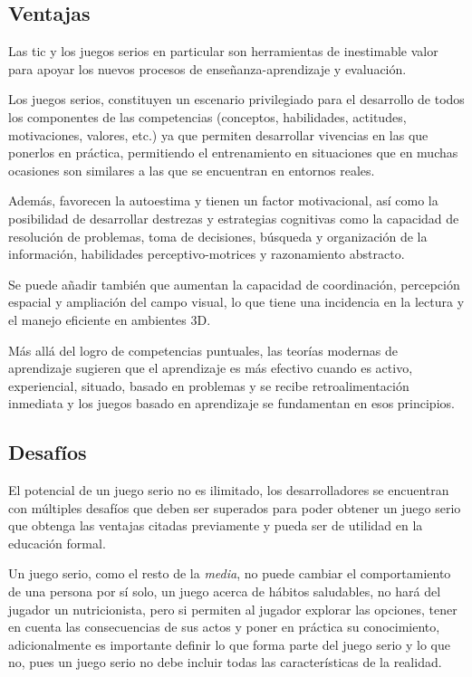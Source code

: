 \subsection{Ventajas}


Las \Gls{tic} y los juegos serios en particular son herramientas de inestimable
valor para apoyar los nuevos procesos de enseñanza-aprendizaje y
evaluación\cite{guenaga2013serious}.

Los juegos serios, constituyen un escenario privilegiado para el desarrollo de
todos los componentes de las competencias (conceptos, habilidades, actitudes,
motivaciones, valores, etc.) ya que permiten desarrollar vivencias en las que
ponerlos en práctica, permitiendo el entrenamiento en situaciones que en muchas
ocasiones son similares a las que se encuentran en entornos
reales\cite{guenaga2013serious}.

Además, favorecen la autoestima y tienen un factor motivacional, así como la
posibilidad de desarrollar destrezas y estrategias cognitivas como la capacidad
de resolución de problemas, toma de decisiones, búsqueda y organización de la
información, habilidades perceptivo-motrices y razonamiento
abstracto\cite{guenaga2013serious}.

Se puede añadir también que aumentan la capacidad de coordinación, percepción
espacial y ampliación del campo visual, lo que tiene una incidencia en la
lectura y el manejo eficiente en ambientes 3D\cite{guenaga2013serious}. 

Más allá del logro de competencias puntuales, las teorías modernas de
aprendizaje sugieren que el aprendizaje es más efectivo cuando es activo,
experiencial, situado, basado en problemas y se recibe retroalimentación
inmediata y los juegos basado en aprendizaje se fundamentan en esos
principios\cite{guenaga2013serious}.



\subsection{Desafíos}


El potencial de un juego serio no es ilimitado, los desarrolladores se
encuentran con múltiples desafíos que deben ser superados para poder obtener un
juego serio que obtenga las ventajas citadas previamente y pueda ser de utilidad
en la educación formal.

Un juego serio, como el resto de la \textit{media}, no puede cambiar el
comportamiento de una persona por sí solo, un juego acerca de hábitos
saludables, no hará del jugador un nutricionista, pero si permiten al jugador
explorar las opciones, tener en cuenta las consecuencias de sus actos y poner en
práctica su conocimiento\cite{education:games}, adicionalmente es importante
definir lo que forma parte del juego serio y lo que no, pues un juego serio no
debe incluir todas las características de la
realidad\cite{stapleton2004serious,videojuegos:gonzaleztardon}. 

